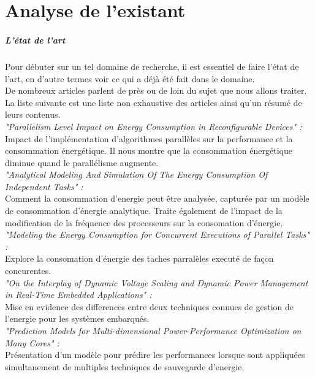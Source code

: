\chapter{Analyse de l'existant}

\paragraph{L'état de l'art \\}
	Pour débuter sur un tel domaine de recherche, il est essentiel de faire l'état de l'art, en d'autre termes voir ce qui a déjà été fait dans le domaine. \\

	De nombreux articles parlent de près ou de loin du sujet que nous allons traiter. \\
	La liste suivante est une liste non exhaustive des articles ainsi qu'un résumé de leurs contenus. \\

	\textit{"Parallelism Level Impact on Energy Consumption in Reconfigurable Devices" :}\\
		Impact de l’implémentation d'algorithmes parallèles sur la performance et la consommation énergétique. Il nous montre que la consommation énergétique diminue quand le parallélisme augmente.\\

	\textit{"Analytical Modeling And Simulation Of The Energy Consumption Of Independent Tasks" :}\\
		Comment la consommation d'energie peut être analysée, capturée par un modèle de consommation d'énergie analytique. Traite également de l'impact de la modification de la fréquence des processeurs sur la consomation d'énergie.\\

	\textit{"Modeling the Energy Consumption for Concurrent Executions of Parallel Tasks" :}\\
		Explore la consomation d'énergie des taches parralèles executé de façon concurentes. \\

	\textit {"On the Interplay of Dynamic Voltage Scaling and Dynamic Power Management in Real-Time Embedded Applications" :}\\
		Mise en evidence des differences entre deux techniques connues de gestion de l'energie pour les systèmes embarqués.\\

	\textit {"Prediction Models for Multi-dimensional Power-Performance Optimization on Many Cores" :}\\
		Présentation d'un modèle pour prédire les performances lorsque sont appliquées simultanement de multiples techniques de sauvegarde d'energie. \\


